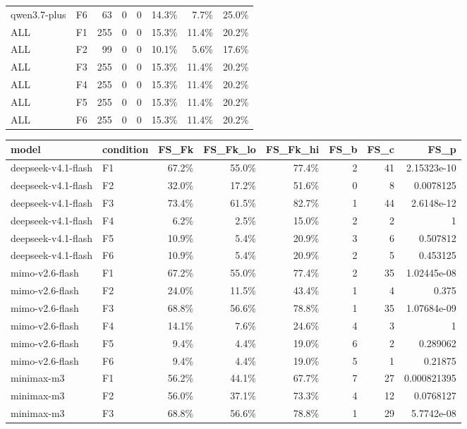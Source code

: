 \begin{tabular}{llrrrrrr}
qwen3.7-plus & F6 & 63 & 0 & 0 & 14.3\% & 7.7\% & 25.0\% \\
ALL & F1 & 255 & 0 & 0 & 15.3\% & 11.4\% & 20.2\% \\
ALL & F2 & 99 & 0 & 0 & 10.1\% & 5.6\% & 17.6\% \\
ALL & F3 & 255 & 0 & 0 & 15.3\% & 11.4\% & 20.2\% \\
ALL & F4 & 255 & 0 & 0 & 15.3\% & 11.4\% & 20.2\% \\
ALL & F5 & 255 & 0 & 0 & 15.3\% & 11.4\% & 20.2\% \\
ALL & F6 & 255 & 0 & 0 & 15.3\% & 11.4\% & 20.2\% \\
\bottomrule
\end{tabular}

\begin{tabular}{llrrrrrr}
\toprule
model & condition & FS\_Fk & FS\_Fk\_lo & FS\_Fk\_hi & FS\_b & FS\_c & FS\_p \\
\midrule
deepseek-v4.1-flash & F1 & 67.2\% & 55.0\% & 77.4\% & 2 & 41 & 2.15323e-10 \\
deepseek-v4.1-flash & F2 & 32.0\% & 17.2\% & 51.6\% & 0 & 8 & 0.0078125 \\
deepseek-v4.1-flash & F3 & 73.4\% & 61.5\% & 82.7\% & 1 & 44 & 2.6148e-12 \\
deepseek-v4.1-flash & F4 & 6.2\% & 2.5\% & 15.0\% & 2 & 2 & 1 \\
deepseek-v4.1-flash & F5 & 10.9\% & 5.4\% & 20.9\% & 3 & 6 & 0.507812 \\
deepseek-v4.1-flash & F6 & 10.9\% & 5.4\% & 20.9\% & 2 & 5 & 0.453125 \\
mimo-v2.6-flash & F1 & 67.2\% & 55.0\% & 77.4\% & 2 & 35 & 1.02445e-08 \\
mimo-v2.6-flash & F2 & 24.0\% & 11.5\% & 43.4\% & 1 & 4 & 0.375 \\
mimo-v2.6-flash & F3 & 68.8\% & 56.6\% & 78.8\% & 1 & 35 & 1.07684e-09 \\
mimo-v2.6-flash & F4 & 14.1\% & 7.6\% & 24.6\% & 4 & 3 & 1 \\
mimo-v2.6-flash & F5 & 9.4\% & 4.4\% & 19.0\% & 6 & 2 & 0.289062 \\
mimo-v2.6-flash & F6 & 9.4\% & 4.4\% & 19.0\% & 5 & 1 & 0.21875 \\
minimax-m3 & F1 & 56.2\% & 44.1\% & 67.7\% & 7 & 27 & 0.000821395 \\
minimax-m3 & F2 & 56.0\% & 37.1\% & 73.3\% & 4 & 12 & 0.0768127 \\
minimax-m3 & F3 & 68.8\% & 56.6\% & 78.8\% & 1 & 29 & 5.7742e-08 \\

\end{tabular}
